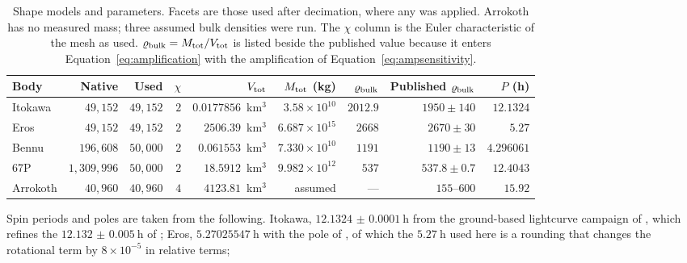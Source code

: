 \begin{table}[htbp]
\centering
\scriptsize
\setlength{\tabcolsep}{4pt}
\caption{Shape models and parameters. Facets are those used after
decimation, where any was applied. Arrokoth has no measured mass; three
assumed bulk densities were run. The $\chi$ column is the Euler
characteristic of the mesh as used. $\varrho_{\mathrm{bulk}} = M_{\mathrm{tot}}/V_{\mathrm{tot}}$ is listed
beside the published value because it enters
Equation~\eqref{eq:amplification} with the amplification of
Equation~\eqref{eq:ampsensitivity}.}
\label{tab:shapes}
\small
\setlength{\tabcolsep}{4.5pt}
\begin{tabular}{lrrrrrrrr}
\toprule
Body & Native & Used & $\chi$ & $V_{\mathrm{tot}}$ & $M_{\mathrm{tot}}$ (kg)
     & $\varrho_{\mathrm{bulk}}$ & Published $\varrho_{\mathrm{bulk}}$ & $P$ (h) \\
\midrule
Itokawa  & $49{,}152$      & $49{,}152$ & $2$ & $0.0177856$~km$^3$ & $3.58\times10^{10}$   & $2012.9$ & $1950\pm140$ & $12.1324$ \\
Eros     & $49{,}152$      & $49{,}152$ & $2$ & $2506.39$~km$^3$   & $6.687\times10^{15}$  & $2668$   & $2670\pm30$  & $5.27$ \\
Bennu    & $196{,}608$     & $50{,}000$ & $2$ & $0.061553$~km$^3$  & $7.330\times10^{10}$  & $1191$   & $1190\pm13$  & $4.296061$ \\
67P      & $1{,}309{,}996$ & $50{,}000$ & $2$ & $18.5912$~km$^3$   & $9.982\times10^{12}$  & $537$    & $537.8\pm0.7$ & $12.4043$ \\
Arrokoth & $40{,}960$      & $40{,}960$ & $4$ & $4123.81$~km$^3$   & assumed               & ---      & $155$--$600$ & $15.92$ \\
\bottomrule
\end{tabular}
\end{table}
Spin periods and poles are taken from the following. Itokawa,
$\SI{12.1324(1)}{\hour}$ from the ground-based lightcurve campaign of
\citet{nishihara2019}, which refines the $\SI{12.132(5)}{\hour}$ of
\citet{kaasalainen2003}; Eros, $\SI{5.27025547}{\hour}$ with the pole of
\citet{miller2002}, of which the $\SI{5.27}{\hour}$ used here is a rounding
that changes the rotational term by $8\times10^{-5}$ in relative terms;

